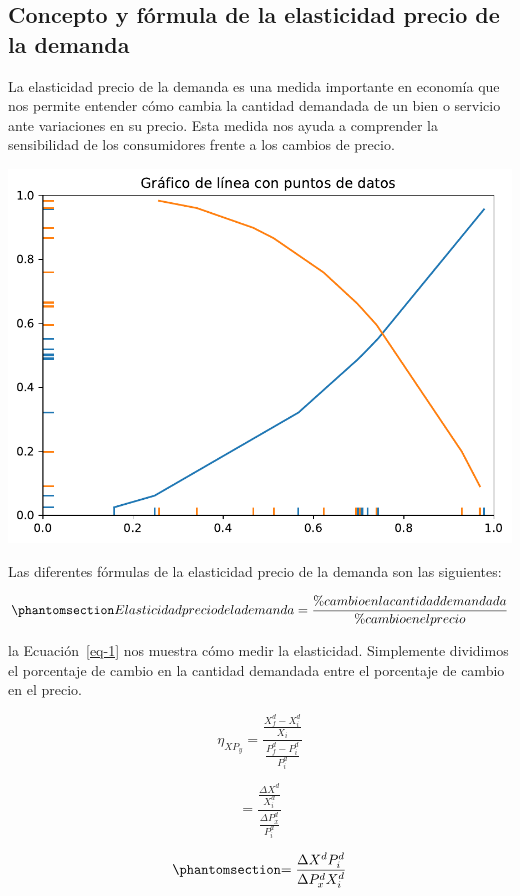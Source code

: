 \documentclass[
  a4paper,
]{article}
\begin{document}
\subsection{Concepto y fórmula de la elasticidad precio de la
demanda}\label{concepto-y-fuxf3rmula-de-la-elasticidad-precio-de-la-demanda}

La elasticidad precio de la demanda es una medida importante en economía
que nos permite entender cómo cambia la cantidad demandada de un bien o
servicio ante variaciones en su precio. Esta medida nos ayuda a
comprender la sensibilidad de los consumidores frente a los cambios de
precio.

\includegraphics{index_files/figure-pdf/cell-2-output-1.pdf}

Las diferentes fórmulas de la elasticidad precio de la demanda son las
siguientes:

\begin{equation}\phantomsection\label{eq-1}{
Elasticidad precio de la demanda =\frac{\% cambio en la cantidad demandada}{\% cambio en el precio}
}\end{equation}

la Ecuación~\ref{eq-1} nos muestra cómo medir la elasticidad.
Simplemente dividimos el porcentaje de cambio en la cantidad demandada
entre el porcentaje de cambio en el precio.

\[
\eta _{XP_y} = \frac{\frac {X_f^d - X_i^d}{X_i}}{\frac {P_f^d - P_i^d}{P_i^d}}
\]

\[
= \frac{\frac{\Delta X^d}{X_i^d}}{\frac{\Delta P_x^d}{P_i^d}}
\]

\begin{equation}\phantomsection\label{eq-2}{
= \frac{\Delta X^d P_i^d}{\Delta P_x^d X_i^d}
}\end{equation}
\end{document}
